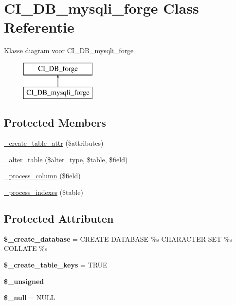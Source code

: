 \hypertarget{class_c_i___d_b__mysqli__forge}{}\section{C\+I\+\_\+\+D\+B\+\_\+mysqli\+\_\+forge Class Referentie}
\label{class_c_i___d_b__mysqli__forge}
Klasse diagram voor C\+I\+\_\+\+D\+B\+\_\+mysqli\+\_\+forge\begin{figure}[H]
\begin{center}
\leavevmode
\includegraphics[height=2.000000cm]{class_c_i___d_b__mysqli__forge}
\end{center}
\end{figure}
\subsection*{Protected Members}
\begin{DoxyCompactItemize}
\item 
\mbox{\hyperlink{class_c_i___d_b__mysqli__forge_a10b25326d82f6ddd9af1935e52e42b72}{\+\_\+create\+\_\+table\+\_\+attr}} (\$attributes)
\item 
\mbox{\hyperlink{class_c_i___d_b__mysqli__forge_a41c6cae02f2fda8b429ad0afb9509426}{\+\_\+alter\+\_\+table}} (\$alter\+\_\+type, \$table, \$field)
\item 
\mbox{\hyperlink{class_c_i___d_b__mysqli__forge_a8f38f1c5b5dddecca4befbe393f3f299}{\+\_\+process\+\_\+column}} (\$field)
\item 
\mbox{\hyperlink{class_c_i___d_b__mysqli__forge_ae0bdb4ea3418590d1894c5b621b5ca50}{\+\_\+process\+\_\+indexes}} (\$table)
\end{DoxyCompactItemize}
\subsection*{Protected Attributen}
\begin{DoxyCompactItemize}
\item 
\mbox{\label{class_c_i___d_b__mysqli__forge_acd23c9a8735806155f1a5d0a87c151f2}} 
{\bfseries \$\+\_\+create\+\_\+database} = \textquotesingle{}C\+R\+E\+A\+TE D\+A\+T\+A\+B\+A\+SE \%s C\+H\+A\+R\+A\+C\+T\+ER S\+ET \%s C\+O\+L\+L\+A\+TE \%s\textquotesingle{}
\item 
\mbox{\label{class_c_i___d_b__mysqli__forge_a73e07acdd35c948ad353903c2827af6e}} 
{\bfseries \$\+\_\+create\+\_\+table\+\_\+keys} = T\+R\+UE
\item 
{\bfseries \$\+\_\+unsigned}
\item 
\mbox{\label{class_c_i___d_b__mysqli__forge_ae58fe6a5104d4a069a49b27533ce808f}} 
{\bfseries \$\+\_\+null} = \textquotesingle{}N\+U\+LL\textquotesingle{}
\end{DoxyCompactItemize}
